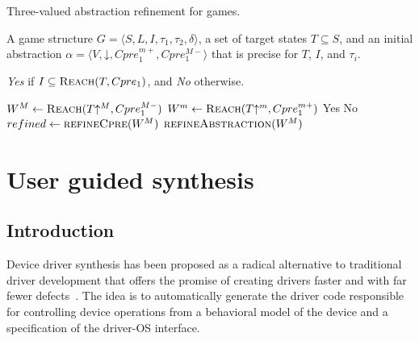 \documentclass[a4paper,twoside,openright,11pt]{book}
\newcommand{\reach}[0]{\textsc{Reach}}
\newcommand{\concrete}[1]{#1\mathord{\downarrow}}
\newcommand{\abstractm}[1]{#1\mathord{\uparrow^m}}
\newcommand{\abstractM}[1]{#1\mathord{\uparrow^M}}
\theoremstyle{definition}
\begin{document}
%

\begin{algorithm}
\caption{Three-valued abstraction refinement for games.}
\label{alg:generic}

\begin{algorithmic}[1]

     A game structure $G = \langle S, L, I, \tau_1, \tau_2, \delta \rangle$, a set 
    of target states $T\subseteq S$, and an initial abstraction $\alpha=\langle V, \concrete{}, Cpre_1^{m+}, Cpre_1^{M-} \rangle$
    that is precise for $T$, $I$, and $\tau_i$.

     {\it Yes} if $I \subseteq \reach(T, Cpre_1)$, and {\it No} otherwise.

    \Loop
        \State $W^M \gets \reach(\abstractM{T}, Cpre_1^{M-})$
        \State $W^m \gets \reach(\abstractm{T}, Cpre_1^{m+})$
        \If{$\abstractM{I} \subseteq W^M$} 
            \State\Return Yes
        \ElsIf{$\abstractM{I} \nsubseteq W^m$} 
            \State\Return No
        \Else       
            \State $refined \gets \Call{refineCpre}{W^M}$
                \State$\Call{refineAbstraction}{W^M}$
            \EndIf
        \EndIf
    \EndLoop
\end{algorithmic}
\end{algorithm}

\chapter{User guided synthesis}

\section{Introduction}\label{sec:user_guided_intro}

Device driver synthesis has been proposed as a radical alternative to traditional driver development that offers the promise of creating drivers faster and with far fewer defects~\cite{Ryzhyk_CKSH_09}. The idea is to automatically generate the driver code responsible for controlling device operations from a behavioral model of the device and a specification of the driver-OS interface.
\end{document}
